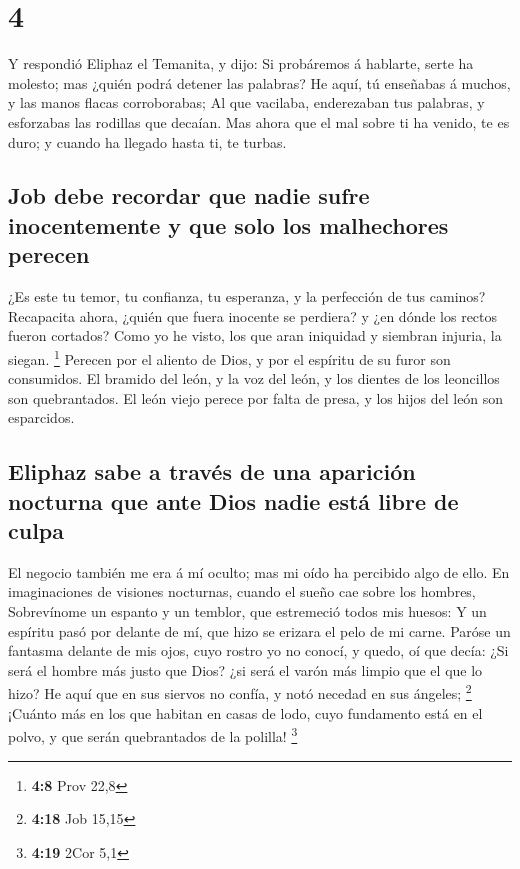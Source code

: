 \hypertarget{section-3}{%
\section{4}\label{section-3}}

 Y respondió Eliphaz el Temanita, y dijo:  Si
probáremos á hablarte, serte ha molesto; mas ¿quién podrá detener las
palabras?  He aquí, tú enseñabas á muchos, y las manos
flacas corroborabas;  Al que vacilaba, enderezaban tus
palabras, y esforzabas las rodillas que decaían.  Mas ahora
que el mal sobre ti ha venido, te es duro; y cuando ha llegado hasta ti,
te turbas.

\hypertarget{job-debe-recordar-que-nadie-sufre-inocentemente-y-que-solo-los-malhechores-perecen}{%
\subsection{Job debe recordar que nadie sufre inocentemente y que solo
los malhechores
perecen}\label{job-debe-recordar-que-nadie-sufre-inocentemente-y-que-solo-los-malhechores-perecen}}

 ¿Es este tu temor, tu confianza, tu esperanza, y la
perfección de tus caminos?  Recapacita ahora, ¿quién que
fuera inocente se perdiera? y ¿en dónde los rectos fueron cortados?
 Como yo he visto, los que aran iniquidad y siembran
injuria, la siegan. \footnote{\textbf{4:8} Prov 22,8} 
Perecen por el aliento de Dios, y por el espíritu de su furor son
consumidos.  El bramido del león, y la voz del león, y los
dientes de los leoncillos son quebrantados.  El león viejo
perece por falta de presa, y los hijos del león son esparcidos.

\hypertarget{eliphaz-sabe-a-travuxe9s-de-una-apariciuxf3n-nocturna-que-ante-dios-nadie-estuxe1-libre-de-culpa}{%
\subsection{Eliphaz sabe a través de una aparición nocturna que ante
Dios nadie está libre de
culpa}\label{eliphaz-sabe-a-travuxe9s-de-una-apariciuxf3n-nocturna-que-ante-dios-nadie-estuxe1-libre-de-culpa}}

 El negocio también me era á mí oculto; mas mi oído ha
percibido algo de ello.  En imaginaciones de visiones
nocturnas, cuando el sueño cae sobre los hombres, 
Sobrevínome un espanto y un temblor, que estremeció todos mis huesos:
 Y un espíritu pasó por delante de mí, que hizo se erizara
el pelo de mi carne.  Paróse un fantasma delante de mis
ojos, cuyo rostro yo no conocí, y quedo, oí que decía:  ¿Si
será el hombre más justo que Dios? ¿si será el varón más limpio que el
que lo hizo?  He aquí que en sus siervos no confía, y notó
necedad en sus ángeles; \footnote{\textbf{4:18} Job 15,15} 
¡Cuánto más en los que habitan en casas de lodo, cuyo fundamento está en
el polvo, y que serán quebrantados de la polilla! \footnote{\textbf{4:19}
  2Cor 5,1}

